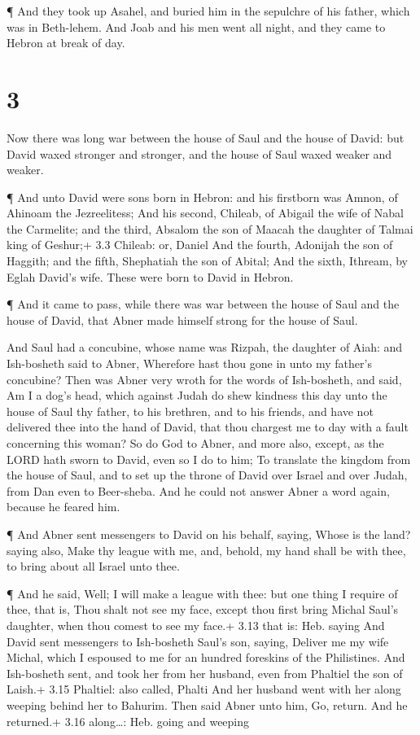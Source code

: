  ¶ And they took up Asahel, and buried him in the sepulchre
of his father, which was in Beth-lehem. And Joab and his men went all
night, and they came to Hebron at break of day.

\hypertarget{section-2}{%
\section{3}\label{section-2}}

 Now there was long war between the house of Saul and the
house of David: but David waxed stronger and stronger, and the house of
Saul waxed weaker and weaker.

 ¶ And unto David were sons born in Hebron: and his
firstborn was Amnon, of Ahinoam the Jezreelitess;  And his
second, Chileab, of Abigail the wife of Nabal the Carmelite; and the
third, Absalom the son of Maacah the daughter of Talmai king of Geshur;+
3.3 Chileab: or, Daniel  And the fourth, Adonijah the son of
Haggith; and the fifth, Shephatiah the son of Abital;  And
the sixth, Ithream, by Eglah David's wife. These were born to David in
Hebron.

 ¶ And it came to pass, while there was war between the
house of Saul and the house of David, that Abner made himself strong for
the house of Saul.

 And Saul had a concubine, whose name was Rizpah, the
daughter of Aiah: and Ish-bosheth said to Abner, Wherefore hast thou
gone in unto my father's concubine?  Then was Abner very
wroth for the words of Ish-bosheth, and said, Am I a dog's head, which
against Judah do shew kindness this day unto the house of Saul thy
father, to his brethren, and to his friends, and have not delivered thee
into the hand of David, that thou chargest me to day with a fault
concerning this woman?  So do God to Abner, and more also,
except, as the LORD hath sworn to David, even so I do to him;
 To translate the kingdom from the house of Saul, and to
set up the throne of David over Israel and over Judah, from Dan even to
Beer-sheba.  And he could not answer Abner a word again,
because he feared him.

 ¶ And Abner sent messengers to David on his behalf,
saying, Whose is the land? saying also, Make thy league with me, and,
behold, my hand shall be with thee, to bring about all Israel unto thee.

 ¶ And he said, Well; I will make a league with thee: but
one thing I require of thee, that is, Thou shalt not see my face, except
thou first bring Michal Saul's daughter, when thou comest to see my
face.+ 3.13 that is: Heb. saying  And David sent messengers
to Ish-bosheth Saul's son, saying, Deliver me my wife Michal, which I
espoused to me for an hundred foreskins of the Philistines.
 And Ish-bosheth sent, and took her from her husband, even
from Phaltiel the son of Laish.+ 3.15 Phaltiel: also called, Phalti
 And her husband went with her along weeping behind her to
Bahurim. Then said Abner unto him, Go, return. And he returned.+ 3.16
along\ldots: Heb. going and weeping

